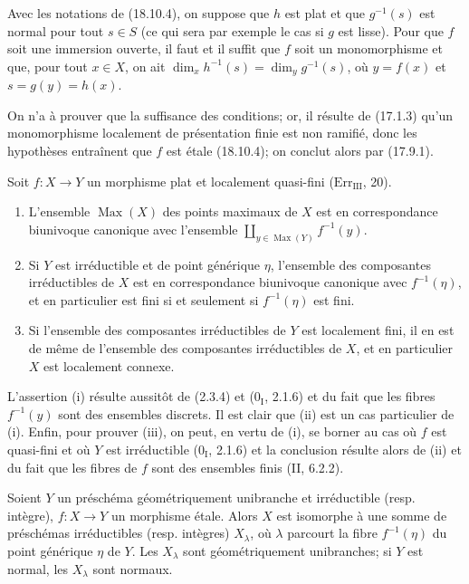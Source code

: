 \begin{corollary}[18.10.5]
\label{IV.18.10.5}
Avec les notations de (18.10.4), on suppose que $h$ est plat et que $g^{-1}(s)$ est normal pour tout $s\in S$ (ce qui sera par exemple le cas si $g$ est lisse). Pour que $f$ soit une immersion ouverte, il faut et il suffit que $f$ soit un monomorphisme et que, pour tout $x\in X$, on ait $\dim_xh^{-1}(s)=\dim_yg^{-1}(s)$, où $y=f(x)$ et $s=g(y)=h(x)$.
\end{corollary}

On n'a à prouver que la suffisance des conditions; or, il résulte de (17.1.3) qu'un monomorphisme localement de présentation finie est non ramifié, donc les hypothèses entraînent que $f$ est étale (18.10.4); on conclut alors par (17.9.1).

\begin{lemma}[18.10.6]
\label{IV.18.10.6}
Soit $f:X\to Y$ un morphisme plat et localement quasi-fini ($\mathrm{Err}_{\mathrm{III}}$, 20).
\begin{enumerate}
  \item[(i)] L'ensemble $\operatorname{Max}(X)$ des points maximaux de $X$ est en correspondance biunivoque canonique avec l'ensemble $\coprod_{y\in\operatorname{Max}(Y)}f^{-1}(y)$.
  \item[(ii)] Si $Y$ est irréductible et de point générique $\eta$, l'ensemble des composantes irréductibles de $X$ est en correspondance biunivoque canonique avec $f^{-1}(\eta)$, et en particulier est fini si et seulement si $f^{-1}(\eta)$ est fini.


  \item[(iii)] Si l'ensemble des composantes irréductibles de $Y$ est localement fini, il en est de même de l'ensemble des composantes irréductibles de $X$, et en particulier $X$ est localement connexe.
\end{enumerate}
\end{lemma}

L'assertion (i) résulte aussitôt de (2.3.4) et ($0_{\mathrm I}$, 2.1.6) et du fait que les fibres $f^{-1}(y)$ sont des ensembles discrets. Il est clair que (ii) est un cas particulier de (i). Enfin, pour prouver (iii), on peut, en vertu de (i), se borner au cas où $f$ est quasi-fini et où $Y$ est irréductible ($0_{\mathrm I}$, 2.1.6) et la conclusion résulte alors de (ii) et du fait que les fibres de $f$ sont des ensembles finis (II, 6.2.2).

\begin{proposition}[18.10.7]
\label{IV.18.10.7}
Soient $Y$ un préschéma géométriquement unibranche et irréductible (resp. intègre), $f:X\to Y$ un morphisme étale. Alors $X$ est isomorphe à une somme de préschémas irréductibles (resp. intègres) $X_\lambda$, où $\lambda$ parcourt la fibre $f^{-1}(\eta)$ du point générique $\eta$ de $Y$. Les $X_\lambda$ sont géométriquement unibranches; si $Y$ est normal, les $X_\lambda$ sont normaux.
\end{proposition}

